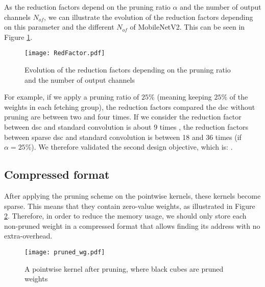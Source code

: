 As the reduction factors depend on the pruning ratio $\alpha$ and the number of output channels $N_{of}$, we can illustrate the evolution of the reduction factors depending on this parameter and the different $N_{of}$ of MobileNetV2. This can be seen in Figure \ref{fig:redfacto}.
%
\begin{figure}[H]
    \centering
    \texttt{[image: RedFactor.pdf]}
    \caption{Evolution of the reduction factors depending on the pruning ratio and the number of output channels}
    \label{fig:redfacto}
\end{figure}

For example, if we apply a pruning ratio of $25\%$ (meaning keeping $25\%$ of the weights in each fetching group), the reduction factors compared the \acrshort{dsc} without pruning are between two and four times. If we consider the reduction factor between \acrshort{dsc} and standard convolution is about 9 times \cite{zhang_channel_2019}, the reduction factors between sparse \acrshort{dsc} and standard convolution is between 18 and 36 times (if $\alpha = 25\%$). We therefore validated the second design objective, which is: \textbf{}.
%
\subsection{Compressed format} \label{subs:compress_f}
%
After applying the pruning scheme on the pointwise kernels, these kernels become sparse. This means that they contain zero-value weights, as illustrated in Figure \ref{fig:pruned_wg}. Therefore, in order to reduce the memory usage, we should only store each non-pruned weight in a compressed format that allows finding its address with no extra-overhead.
%
\begin{figure}[H]
    \centering
    \texttt{[image: pruned\_wg.pdf]}
    \caption{A pointwise kernel after pruning, where black cubes are pruned weights}
    \label{fig:pruned_wg}
\end{figure}


